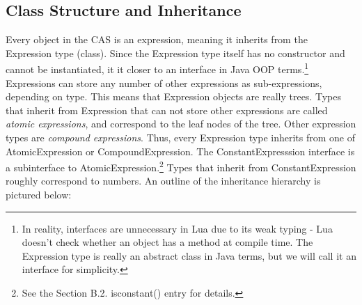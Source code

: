 \documentclass{article}
\begin{document}
 \subsection{Class Structure and Inheritance}
 
Every object in the CAS is an expression, meaning it inherits from the {\ttfamily Expression} type (class). Since the {\ttfamily Expression} type itself has no constructor and cannot be instantiated, it it closer to an interface in Java OOP terms.\footnote{In reality, interfaces are unnecessary in Lua due to its weak typing - Lua doesn't check whether an object has a method at compile time. The {\ttfamily Expression} type is really an abstract class in Java terms, but we will call it an interface for simplicity.} {\ttfamily Expression}s can store any number of other expressions as sub-expressions, depending on type. This means that {\ttfamily Expression} objects are really trees. Types that inherit from {\ttfamily Expression} that can not store other expressions are called \emph{atomic expressions}, and correspond to the leaf nodes of the tree. Other expression types are \emph{compound expressions}. Thus, every {\ttfamily Expression} type inherits from one of {\ttfamily AtomicExpression} or {\ttfamily CompoundExpression}. The {\ttfamily ConstantExpresssion} interface is a subinterface to {\ttfamily AtomicExpression}.\footnote{See the Section B.2. {\ttfamily isconstant()} entry for details.} Types that inherit from {\ttfamily ConstantExpression} roughly correspond to numbers. An outline of the inheritance hierarchy is pictured below:
\end{document}
